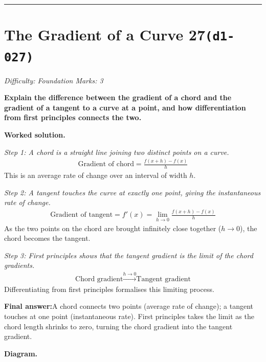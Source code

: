 \documentclass[11pt]{article}
\newcommand{\question}[1]{\par\medskip\noindent\textbf{#1}\par}
\begin{document}
\medskip\hrule

\section*{The Gradient of a Curve 27\quad\small\texttt{(d1-027)}}
\textit{Difficulty: Foundation \quad\textbar\quad Marks: 3}

\question{Explain the difference between the gradient of a chord and the gradient of a tangent to a curve at a point, and how differentiation from first principles connects the two.}

\textbf{Worked solution.}

\textit{Step 1: A chord is a straight line joining two distinct points on a curve.}
\[\begin{gathered}
\text{Gradient of chord} = \frac{f(x+h) - f(x)}{h}
\end{gathered}\]
This is an average rate of change over an interval of width \( h \).

\textit{Step 2: A tangent touches the curve at exactly one point, giving the instantaneous rate of change.}
\[\begin{gathered}
\text{Gradient of tangent} = f'(x) = \lim_{h \to 0} \frac{f(x+h)-f(x)}{h}
\end{gathered}\]
As the two points on the chord are brought infinitely close together (\( h \to 0 \)), the chord becomes the tangent.

\textit{Step 3: First principles shows that the tangent gradient is the limit of the chord gradients.}
\[\begin{gathered}
\text{Chord gradient} \xrightarrow{h \to 0} \text{Tangent gradient}
\end{gathered}\]
Differentiating from first principles formalises this limiting process.

\begin{answerbox}
\textbf{Final answer:}\quad A chord connects two points (average rate of change); a tangent touches at one point (instantaneous rate). First principles takes the limit as the chord length shrinks to zero, turning the chord gradient into the tangent gradient.
\end{answerbox}
\textbf{Diagram.}
\end{document}
